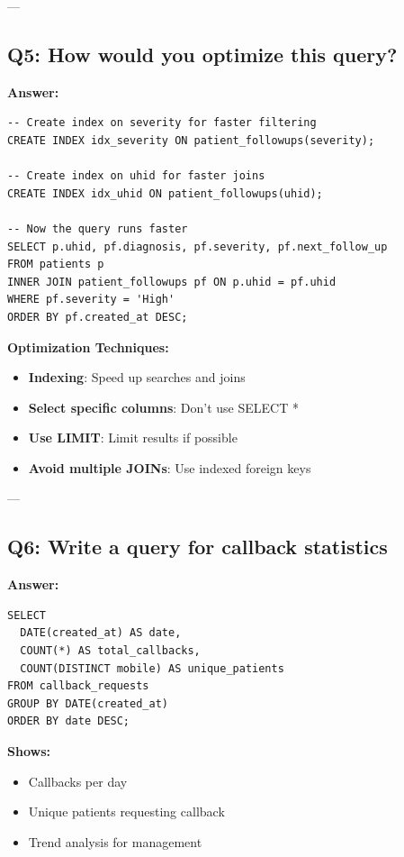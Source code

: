 \documentclass[12pt,a4paper]{article}
\begin{document}
---

\subsection{Q5: How would you optimize this query?}

\textbf{Answer:}

\begin{lstlisting}[caption={Optimized Query}]
-- Create index on severity for faster filtering
CREATE INDEX idx_severity ON patient_followups(severity);

-- Create index on uhid for faster joins
CREATE INDEX idx_uhid ON patient_followups(uhid);

-- Now the query runs faster
SELECT p.uhid, pf.diagnosis, pf.severity, pf.next_follow_up
FROM patients p
INNER JOIN patient_followups pf ON p.uhid = pf.uhid
WHERE pf.severity = 'High'
ORDER BY pf.created_at DESC;
\end{lstlisting}

\textbf{Optimization Techniques:}
\begin{itemize}
    \item \textbf{Indexing}: Speed up searches and joins
    \item \textbf{Select specific columns}: Don't use SELECT *
    \item \textbf{Use LIMIT}: Limit results if possible
    \item \textbf{Avoid multiple JOINs}: Use indexed foreign keys
\end{itemize}

---

\subsection{Q6: Write a query for callback statistics}

\textbf{Answer:}

\begin{lstlisting}[caption={Callback Statistics}]
SELECT 
  DATE(created_at) AS date,
  COUNT(*) AS total_callbacks,
  COUNT(DISTINCT mobile) AS unique_patients
FROM callback_requests
GROUP BY DATE(created_at)
ORDER BY date DESC;
\end{lstlisting}

\textbf{Shows:}
\begin{itemize}
    \item Callbacks per day
    \item Unique patients requesting callback
    \item Trend analysis for management
\end{itemize}
\end{document}
